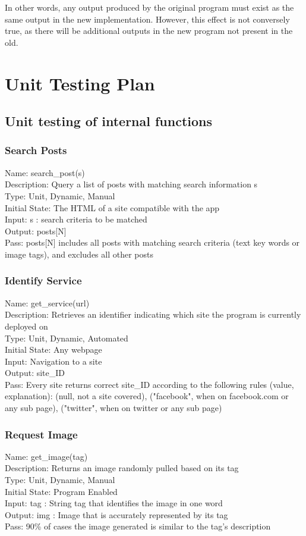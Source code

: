 \documentclass[12pt, titlepage]{article}
\begin{document}
In other words, any output produced by the original program must exist as the same output in the new implementation. However, this effect is not conversely true, as there will be additional outputs in the new program not present in the old.

				
\section{Unit Testing Plan}
		
\subsection{Unit testing of internal functions}

\subsubsection{Search Posts}
Name: search\_post(s) \\
Description: Query a list of posts with matching search information s \\
Type: Unit, Dynamic, Manual \\
Initial State: The HTML of a site compatible with the app \\
Input: s : search criteria to be matched \\
Output: posts[N] \\
Pass: posts[N] includes all posts with matching search criteria (text key words or image tags), and excludes all other posts \\
\subsubsection{Identify Service}
Name: get\_service(url) \\
Description: Retrieves an identifier indicating which site the program is currently deployed on \\
Type: Unit, Dynamic, Automated \\
Initial State: Any webpage \\
Input: Navigation to a site \\
Output: site\_ID \\
Pass: Every site returns correct site\_ID according to the following rules (value, explanation): (null, not a site covered), ("facebook", when on facebook.com or any sub page), ("twitter", when on twitter or any sub page) \\
\subsubsection{Request Image}
Name: get\_image(tag) \\
Description: Returns an image randomly pulled based on its tag \\
Type: Unit, Dynamic, Manual \\
Initial State: Program Enabled \\
Input: tag : String tag that identifies the image in one word \\
Output: img : Image that is accurately represented by its tag \\
Pass: 90\% of cases the image generated is similar to the tag's description \\
\end{document}
